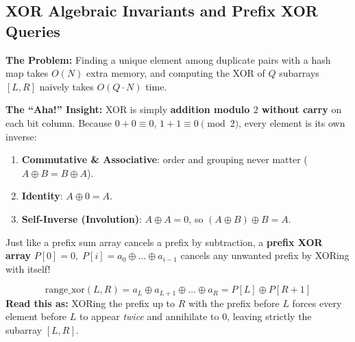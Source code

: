 \documentclass[11pt,a4paper]{article}
\theoremstyle{definition}
\newcommand{\painbeat}{\textbf{\color{accentamber}The Problem:} }
\newcommand{\ahabeat}{\textbf{\color{accentteal}The ``Aha!'' Insight:} }
\begin{document}
\subsection{XOR Algebraic Invariants and Prefix XOR Queries}

\painbeat Finding a unique element among duplicate pairs with a hash map takes $O(N)$ extra memory, and computing the XOR of $Q$ subarrays $[L, R]$ naively takes $O(Q \cdot N)$ time.

\ahabeat XOR is simply \textbf{addition modulo $2$ without carry} on each bit column. Because $0 + 0 \equiv 0$, $1 + 1 \equiv 0 \pmod 2$, every element is its own inverse:
\begin{enumerate}[itemsep=2pt, topsep=2pt]
    \item \textbf{Commutative \& Associative}: order and grouping never matter ($A \oplus B = B \oplus A$).
    \item \textbf{Identity}: $A \oplus 0 = A$.
    \item \textbf{Self-Inverse (Involution)}: $A \oplus A = 0$, so $(A \oplus B) \oplus B = A$.
\end{enumerate}

Just like a prefix sum array cancels a prefix by subtraction, a \textbf{prefix XOR array} $P[0] = 0,\; P[i] = a_0 \oplus \dots \oplus a_{i-1}$ cancels any unwanted prefix by XORing with itself!

\begin{formulabox}
$$\text{range\_xor}(L, R) = a_L \oplus a_{L+1} \oplus \dots \oplus a_R = P[L] \oplus P[R + 1]$$
\textbf{Read this as:} XORing the prefix up to $R$ with the prefix before $L$ forces every element before $L$ to appear \emph{twice} and annihilate to $0$, leaving strictly the subarray $[L, R]$.
\end{formulabox}
\end{document}
